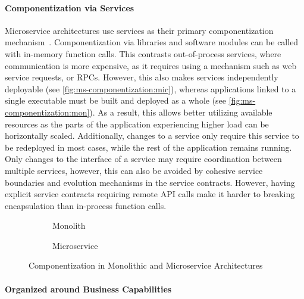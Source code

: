\paragraph{Componentization via Services}

Microservice architectures use services as their primary componentization mechanism~\cite{Lewis2014}.
Componentization via libraries and software modules can be called with in-memory function calls.
This contrasts out-of-process services, where communication is more expensive, as it requires using a mechanism such as web service requests, or \acp{RPC}.
However, this also makes services independently deployable (see \autoref{fig:ms-componentization:mic}), whereas applications linked to a single executable must be built and deployed as a whole (see \autoref{fig:ms-componentization:mon}).
As a result, this allows better utilizing available resources as the parts of the application experiencing higher load can be horizontally scaled.
Additionally, changes to a service only require this service to be redeployed in most cases, while the rest of the application remains running.
Only changes to the interface of a service may require coordination between multiple services, however, this can also be avoided by cohesive service boundaries and evolution mechanisms in the service contracts.
However, having explicit service contracts requiring remote \ac{API} calls make it harder to breaking encapsulation than in-process function calls.

\begin{figure}[!htb]
    \centering
    \begin{subfigure}{.5\textwidth}
        \centering
        
        \caption{Monolith}\label{fig:ms-componentization:mon}
    \end{subfigure}%
    \begin{subfigure}{.5\textwidth}
        \centering
        
        \caption{Microservice}\label{fig:ms-componentization:mic}
    \end{subfigure}
    \caption{Componentization in Monolithic and Microservice Architectures~\cite{Lewis2014}}\label{fig:ms-componentization}
\end{figure}

\paragraph{Organized around Business Capabilities}

